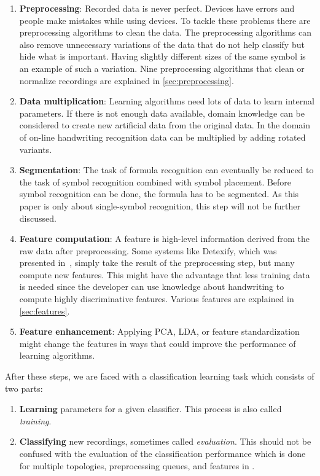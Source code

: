 \documentclass[9pt,technote]{IEEEtran}
\begin{document}
\begin{enumerate}
    \item \textbf{Preprocessing}: Recorded data is never perfect. Devices have
          errors and people make mistakes while using devices. To tackle
          these problems there are preprocessing algorithms to clean the data.
          The preprocessing algorithms can also remove unnecessary variations of
          the data that do not help classify but hide what is important.
          Having slightly different sizes of the same symbol is an example of such a
          variation. Nine preprocessing algorithms that clean or normalize
          recordings are explained in
          \cref{sec:preprocessing}.
    \item \textbf{Data multiplication}: Learning algorithms need lots of data
          to learn internal parameters. If there is not enough data available,
          domain knowledge can be considered to create new artificial data from
          the original data. In the domain of on-line handwriting recognition
          data can be multiplied by adding rotated variants.
    \item \textbf{Segmentation}: The task of formula recognition can eventually
          be reduced to the task of symbol recognition combined with symbol
          placement. Before symbol recognition can be done, the formula has
          to be segmented. As this paper is only about single-symbol
          recognition, this step will not be further discussed.
    \item \textbf{Feature computation}: A feature is high-level information
          derived from the raw data after preprocessing. Some systems like
          Detexify, which was presented in~\cite{Kirsch}, simply take the
          result of the preprocessing step, but many compute new features. This
          might have the advantage that less training data is needed since the
          developer can use knowledge about handwriting to compute highly
          discriminative features. Various features are explained in
          \cref{sec:features}.
    \item \textbf{Feature enhancement}: Applying PCA, LDA, or
          feature standardization might change the features in ways that could
          improve the performance of learning algorithms.
\end{enumerate}

After these steps, we are faced with a classification learning task which consists of
two parts:
\begin{enumerate}
    \item \textbf{Learning} parameters for a given classifier. This process is
          also called \textit{training}.
    \item \textbf{Classifying} new recordings, sometimes called
          \textit{evaluation}. This should not be confused with the evaluation
          of the classification performance which is done for multiple
          topologies, preprocessing queues, and features in .
\end{enumerate}
\end{document}
